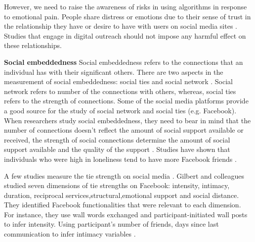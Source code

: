 However, we need to raise the awareness of risks in using algorithms in response to emotional pain. People share distress or emotions due to their sense of trust in the relationship they have or desire to have with users on social media sites \cite{brownlie2018looking}. Studies that engage in digital outreach should not impose any harmful effect on these relationships.

\textbf{Social embeddedness}
Social embeddedness refers to the connections that an individual has with their significant others. There are two aspects in the measurement of social embeddedness: social ties and social network \cite{sarason1983assessing}. Social network refers to number of the connections with others, whereas, social ties refers to the strength of connections. Some of the social media platforms provide a good source for the study of social network and social ties (e.g. Facebook). When researchers study social embeddedness, they need to bear in mind that the number of connections doesn't reflect the amount of social support available or received, the strength of social connections determine the amount of social support available and the quality of the support \cite{burke2010social}. Studies have shown that individuals who were high in loneliness tend to have more Facebook friends \cite{skues_effects_2012}.  

A few studies measure the tie strength on social media \cite{xiang2010modeling}. Gilbert and colleagues studied seven dimensions of tie strengths on Facebook: intensity, intimacy, duration, reciprocal services,structural,emotional support and social distance. They identified Facebook functionalities that were relevant to each dimension. For instance, they use wall words exchanged and participant-initiated wall posts to infer intensity. Using participant’s number of friends, days since last communication to infer intimacy variables \cite{gilbert2009predicting}. 


